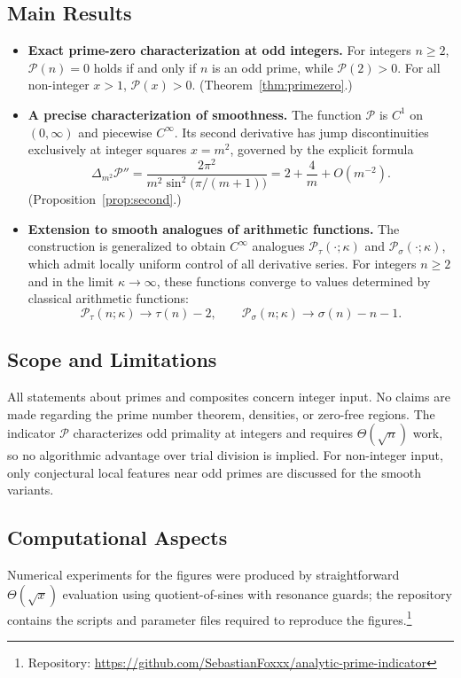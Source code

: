 \documentclass[11pt,a4paper]{amsart}
\theoremstyle{plain}
\theoremstyle{definition}
\theoremstyle{remark}
\begin{document}
\subsection*{Main Results}
\begin{itemize}
  \item \textbf{Exact prime-zero characterization at odd integers.} For integers \(n\ge2\), \(\mathcal P(n)=0\) holds if and only if $n$ is an odd prime, while \(\mathcal P(2)>0\). For all non-integer \(x>1\), \(\mathcal P(x)>0\). (Theorem~\ref{thm:primezero}.)
  \item \textbf{A precise characterization of smoothness.} The function \(\mathcal P\) is \(C^1\) on \((0,\infty)\) and piecewise \(C^\infty\). Its second derivative has jump discontinuities exclusively at integer squares \(x=m^2\), governed by the explicit formula
  \[
  \Delta_{m^{2}}\mathcal{P}''=\frac{2\pi^{2}}{m^{2}\sin^{2}\!\bigl(\pi/(m+1)\bigr)}
  =2+\frac{4}{m}+O(m^{-2}).
  \]
  (Proposition~\ref{prop:second}.)
  \item \textbf{Extension to smooth analogues of arithmetic functions.} The construction is generalized to obtain \(C^\infty\) analogues \(\mathcal P_\tau(\cdot;\kappa)\) and \(\mathcal P_\sigma(\cdot;\kappa)\), which admit locally uniform control of all derivative series. For integers \(n\ge2\) and in the limit \(\kappa\to\infty\), these functions converge to values determined by classical arithmetic functions:
  \[
  \mathcal{P}_\tau(n;\kappa)\to \tau(n)-2,\qquad
  \mathcal{P}_\sigma(n;\kappa)\to \sigma(n)-n-1.
  \]
\end{itemize}

\subsection*{Scope and Limitations}
All statements about primes and composites concern integer input. No claims are made regarding the prime number theorem, densities, or zero-free regions. The indicator $\mathcal P$ characterizes odd primality at integers and requires $\Theta(\sqrt n)$ work, so no algorithmic advantage over trial division is implied. For non-integer input, only conjectural local features near odd primes are discussed for the smooth variants.

\subsection*{Computational Aspects}
Numerical experiments for the figures were produced by straightforward \(\Theta(\sqrt{x})\) evaluation using quotient-of-sines with resonance guards; the repository contains the scripts and parameter files required to reproduce the figures.\footnote{Repository: \url{https://github.com/SebastianFoxxx/analytic-prime-indicator}}
\end{document}
